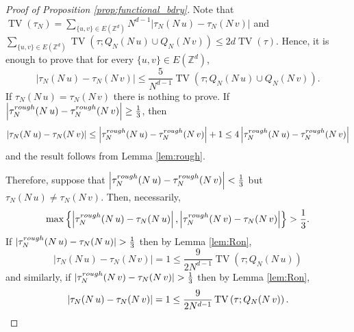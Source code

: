\documentclass[11pt, reqno]{amsart}
\newcommand{\Z}{\mathbb{Z}}
\DeclareMathOperator{\TV}{TV}
\numberwithin{equation}{section}
\begin{document}
\begin{proof}[Proof of Proposition \ref{prop:functional_bdry}]
Note that $\TV(\tau_N)=\sum_{\{u,v\}\in E(\Z^d)}N^{d-1}\left\lvert\tau_N(N\,u)-\tau_N(N\,v)\right\rvert$ and 
$\sum_{\{u,v\}\in E(\Z^d)}\TV\left(\tau;Q_N(N\,u)\cup Q_N(N\,v)\right)\leq 2d\TV(\tau)$.
Hence,
it is enough to prove that for every $\{u,v\}\in E(\Z^d)$, 
\begin{equation*}
\left\lvert\tau_N(N\,u)-\tau_N(N\,v)\right\rvert
\leq\frac{5}{N^{d-1}}\TV\left(\tau;Q_N(N\,u)\cup Q_N(N\,v)\right).
\end{equation*}
If $\tau_N(N\,u)=\tau_N(N\,v)$ there is nothing to prove.
If $\left\lvert\tau^{\rm rough}_N(N\,u)-\tau^{\rm rough}_N(N\,v)\right\rvert\geq\frac{1}{3}$, then 
$$
\left\lvert\tau_N(N\,u)-\tau_N(N\,v)\right\rvert\leq \left\lvert\tau^{\rm rough}_N(N\,u)-\tau^{\rm rough}_N(N\,v)\right\rvert+1\leq 4\left\lvert\tau^{\rm rough}_N(N\,u)-\tau^{\rm rough}_N(N\,v)\right\rvert
$$
and the result follows from Lemma \ref{lem:rough}.

Therefore, suppose that 
$\left\lvert\tau^{\rm rough}_N(N\,u)-\tau^{\rm rough}_N(N\,v)\right\rvert<\frac{1}{3}$
but $\tau_N(N\,u)\neq\tau_N(N\,v)$.
Then, necessarily, 
$$
\max\left\{\left\lvert\tau^{\rm rough}_N(N\,u)-\tau_N(N\,u)\right\rvert,\left\lvert\tau^{\rm rough}_N(N\,v)-\tau_N(N\,v)\right\rvert\right\}>\frac{1}{3}.
$$
If $\lvert\tau^{\rm rough}_N(N\,u)-\tau_N(N\,u)\rvert>\frac{1}{3}$ then by Lemma \ref{lem:Ron},
\begin{equation*}
\left\lvert\tau_N(N\,u)-\tau_N(N\,v)\right\rvert=1
\leq\frac{9}{2N^{d-1}}\TV\left(\tau; Q_N(N\,u)\right)
\end{equation*}
and similarly, if $\lvert\tau^{\rm rough}_N(N\,v)-\tau_N(N\,v)\rvert>\frac{1}{3}$ then by Lemma \ref{lem:Ron},
\begin{equation*}
\left\lvert\tau_N(N\,u)-\tau_N(N\,v)\right\rvert=1
\leq\frac{9}{2N^{d-1}}\TV\left(\tau; Q_N(N\,v)\right).
\qedhere\end{equation*}
\end{proof}
\end{document}
